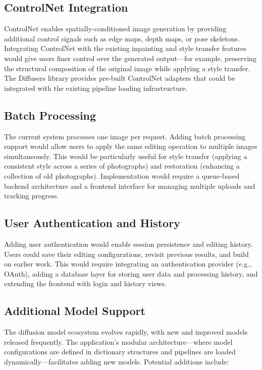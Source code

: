 \documentclass[12pt,a4paper]{report}
\begin{document}
\subsection{ControlNet Integration}

ControlNet enables spatially-conditioned image generation by providing additional control signals such as edge maps, depth maps, or pose skeletons. Integrating ControlNet with the existing inpainting and style transfer features would give users finer control over the generated output---for example, preserving the structural composition of the original image while applying a style transfer. The Diffusers library provides pre-built ControlNet adapters that could be integrated with the existing pipeline loading infrastructure.

\subsection{Batch Processing}

The current system processes one image per request. Adding batch processing support would allow users to apply the same editing operation to multiple images simultaneously. This would be particularly useful for style transfer (applying a consistent style across a series of photographs) and restoration (enhancing a collection of old photographs). Implementation would require a queue-based backend architecture and a frontend interface for managing multiple uploads and tracking progress.

\subsection{User Authentication and History}

Adding user authentication would enable session persistence and editing history. Users could save their editing configurations, revisit previous results, and build on earlier work. This would require integrating an authentication provider (e.g., OAuth), adding a database layer for storing user data and processing history, and extending the frontend with login and history views.

\subsection{Additional Model Support}

The diffusion model ecosystem evolves rapidly, with new and improved models released frequently. The application's modular architecture---where model configurations are defined in dictionary structures and pipelines are loaded dynamically---facilitates adding new models. Potential additions include:
\end{document}
